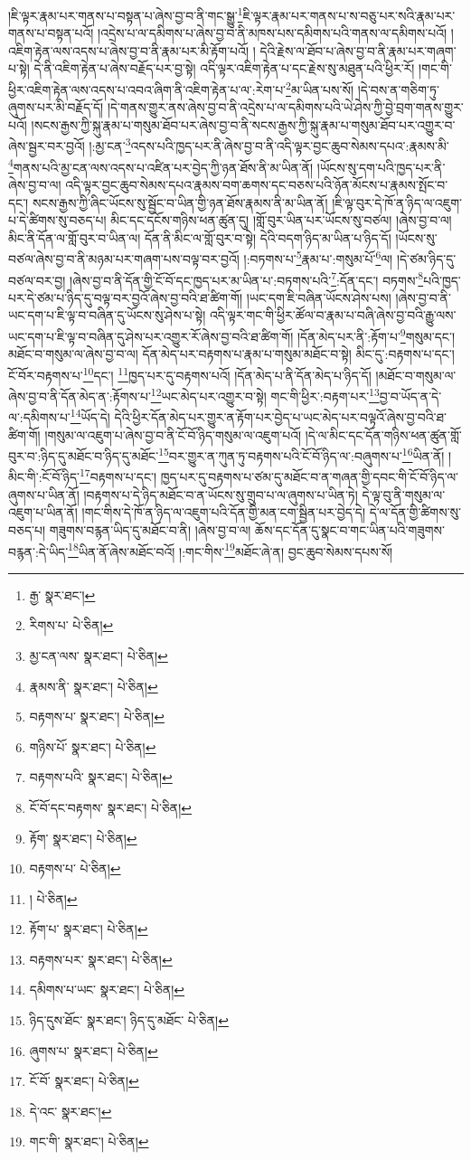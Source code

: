 །ཇི་ལྟར་རྣམ་པར་གནས་པ་བསྟན་པ་ཞེས་བྱ་བ་ནི་གང་སྒྱུ་\footnote{རྒྱ་  སྣར་ཐང་། }ཇི་ལྟར་རྣམ་པར་གནས་པ་ས་བཅུ་པར་སའི་རྣམ་པར་གནས་པ་བསྟན་པའོ། །འདྲེས་པ་ལ་དམིགས་པ་ཞེས་བྱ་བ་ནི་མཁས་པས་དམིགས་པའི་གནས་ལ་དམིགས་པའོ། །འཇིག་རྟེན་ལས་འདས་པ་ཞེས་བྱ་བ་ནི་རྣམ་པར་མི་རྟོག་པའོ། །
དེའི་རྗེས་ལ་ཐོབ་པ་ཞེས་བྱ་བ་ནི་རྣམ་པར་གཞག་པ་སྟེ། དེ་ནི་འཇིག་རྟེན་པ་ཞེས་བརྗོད་པར་བྱ་སྟེ། འདི་ལྟར་འཇིག་རྟེན་པ་དང་རྗེས་སུ་མཐུན་པའི་ཕྱིར་རོ། །གང་གི་ཕྱིར་འཇིག་རྟེན་ལས་འདས་པ་འབའ་ཞིག་ནི་འཇིག་རྟེན་པ་ལ་:རེག་པ་\footnote{རིགས་པ་  པེ་ཅིན། }མ་ཡིན་པས་སོ། །དེ་བས་ན་གཅིག་ཏུ་ཞུགས་པར་མི་བརྗོད་དོ། །དེ་གནས་གྱུར་ནས་ཞེས་བྱ་བ་ནི་འདྲེས་པ་ལ་དམིགས་པའི་ཡེ་ཤེས་ཀྱི་བྱེ་བྲག་གནས་གྱུར་པའོ། །སངས་རྒྱས་ཀྱི་སྐུ་རྣམ་པ་གསུམ་ཐོབ་པར་ཞེས་བྱ་བ་ནི་སངས་རྒྱས་ཀྱི་སྐུ་རྣམ་པ་གསུམ་ཐོབ་པར་འགྱུར་བ་ཞེས་སྦྱར་བར་བྱའོ། །:མྱ་ངན་\footnote{མྱ་ངན་ལས་  སྣར་ཐང་།  པེ་ཅིན། }འདས་པའི་ཁྱད་པར་ནི་ཞེས་བྱ་བ་ནི་འདི་ལྟར་བྱང་ཆུབ་སེམས་དཔའ་:རྣམས་མི་\footnote{རྣམས་ནི་  སྣར་ཐང་།  པེ་ཅིན། }གནས་པའི་མྱ་ངན་ལས་འདས་པ་འཛིན་པར་བྱེད་ཀྱི་ཉན་ཐོས་ནི་མ་ཡིན་ནོ། །ཡོངས་སུ་དག་པའི་ཁྱད་པར་ནི་ཞེས་བྱ་བ་ལ། འདི་ལྟར་བྱང་ཆུབ་སེམས་དཔའ་རྣམས་བག་ཆགས་དང་བཅས་པའི་ཉོན་མོངས་པ་རྣམས་སྤོང་བ་དང་། སངས་རྒྱས་ཀྱི་ཞིང་ཡོངས་སུ་སྦྱོང་བ་ཡིན་གྱི་ཉན་ཐོས་རྣམས་ནི་མ་ཡིན་ནོ། །ཇི་ལྟ་བུར་དེ་ཁོ་ན་ཉིད་ལ་འཇུག་པ་དེ་ཚིགས་སུ་བཅད་པ། མིང་དང་དངོས་གཉིས་ཕན་ཚུན་དུ། །གློ་བུར་ཡིན་པར་ཡོངས་སུ་བཙལ། །ཞེས་བྱ་བ་ལ། མིང་ནི་དོན་ལ་གློ་བུར་བ་ཡིན་ལ། དོན་ནི་མིང་ལ་གློ་བུར་བ་སྟེ། དེའི་བདག་ཉིད་མ་ཡིན་པ་ཉིད་དོ། །ཡོངས་སུ་བཙལ་ཞེས་བྱ་བ་ནི་མཉམ་པར་གཞག་པས་བལྟ་བར་བྱའོ། །:བཏགས་པ་\footnote{བརྟགས་པ་  སྣར་ཐང་།  པེ་ཅིན། }རྣམ་པ་:གསུམ་པོ་\footnote{གཉིས་པོ་  སྣར་ཐང་།  པེ་ཅིན། }ལ། །དེ་ཙམ་ཉིད་དུ་བཙལ་བར་བྱ། །ཞེས་བྱ་བ་ནི་དོན་གྱི་ངོ་བོ་དང་ཁྱད་པར་མ་ཡིན་པ་:བཏགས་པའི་\footnote{བརྟགས་པའི་  སྣར་ཐང་།  པེ་ཅིན། }:དོན་དང་། བཏགས་\footnote{ངོ་བོ་དང་བརྟགས་  སྣར་ཐང་།  པེ་ཅིན། }པའི་ཁྱད་པར་དེ་ཙམ་པ་ཉིད་དུ་བལྟ་བར་བྱའོ་ཞེས་བྱ་བའི་ཐ་ཚིག་གོ། །ཡང་དག་ཇི་བཞིན་ཡོངས་ཤེས་པས། །ཞེས་བྱ་བ་ནི་ཡང་དག་པ་ཇི་ལྟ་བ་བཞིན་དུ་ཡོངས་སུ་ཤེས་པ་སྟེ། འདི་ལྟར་གང་གི་ཕྱིར་ཚོལ་བ་རྣམ་པ་བཞི་ཞེས་བྱ་བའི་རྒྱུ་ལས་ཡང་དག་པ་ཇི་ལྟ་བ་བཞིན་དུ་ཤེས་པར་འགྱུར་རོ་ཞེས་བྱ་བའི་ཐ་ཚིག་གོ། །དོན་མེད་པར་ནི་:རྟོག་པ་\footnote{རྟོག་  སྣར་ཐང་།  པེ་ཅིན། }གསུམ་དང་། མཐོང་བ་གསུམ་ལ་ཞེས་བྱ་བ་ལ། དོན་མེད་པར་བརྟགས་པ་རྣམ་པ་གསུམ་མཐོང་བ་སྟེ། མིང་དུ་:བརྟགས་པ་དང་། ངོ་བོར་བརྟགས་པ་\footnote{བརྟགས་པ་  པེ་ཅིན། }དང་། \footnote{།    པེ་ཅིན། }ཁྱད་པར་དུ་བརྟགས་པའོ། །དོན་མེད་པ་ནི་དོན་མེད་པ་ཉིད་དོ། །མཐོང་བ་གསུམ་ལ་ཞེས་བྱ་བ་ནི་དོན་མེད་ན་:རྟོགས་པ་\footnote{རྟོག་པ་  སྣར་ཐང་།  པེ་ཅིན། }ཡང་མེད་པར་འགྱུར་བ་སྟེ། གང་གི་ཕྱིར་:བརྟག་པར་\footnote{བརྟགས་པར་  སྣར་ཐང་།  པེ་ཅིན། }བྱ་བ་ཡོད་ན་དེ་ལ་:དམིགས་པ་\footnote{དམིགས་པ་ཡང་  སྣར་ཐང་།  པེ་ཅིན། }ཡོད་དེ། དེའི་ཕྱིར་དོན་མེད་པར་གྱུར་ན་རྟོག་པར་བྱེད་པ་ཡང་མེད་པར་བལྟའོ་ཞེས་བྱ་བའི་ཐ་ཚིག་གོ། །གསུམ་ལ་འཇུག་པ་ཞེས་བྱ་བ་ནི་ངོ་བོ་ཉིད་གསུམ་ལ་འཇུག་པའོ། །དེ་ལ་མིང་དང་དོན་གཉིས་ཕན་ཚུན་གློ་བུར་བ་:ཉིད་དུ་མཐོང་བ་ཉིད་དུ་མཐོང་\footnote{ཉིད་དུས་ཐོང་  སྣར་ཐང་། ཉིད་དུ་མཐོང་  པེ་ཅིན། }བར་གྱུར་ན་ཀུན་ཏུ་བརྟགས་པའི་ངོ་བོ་ཉིད་ལ་:བཞུགས་པ་\footnote{ཞུགས་པ་  སྣར་ཐང་།  པེ་ཅིན། }ཡིན་ནོ། །མིང་གི་:ངོ་བོ་ཉིད་\footnote{ངོ་བོ་  སྣར་ཐང་།  པེ་ཅིན། }བརྟགས་པ་དང་། ཁྱད་པར་དུ་བརྟགས་པ་ཙམ་དུ་མཐོང་བ་ན་གཞན་གྱི་དབང་གི་ངོ་བོ་ཉིད་ལ་ཞུགས་པ་ཡིན་ནོ། །བརྟགས་པ་དེ་ཉིད་མཐོང་བ་ན་ཡོངས་སུ་གྲུབ་པ་ལ་ཞུགས་པ་ཡིན་ཏེ། དེ་ལྟ་བུ་ནི་གསུམ་ལ་འཇུག་པ་ཡིན་ནོ། །གང་གིས་དེ་ཁོ་ན་ཉིད་ལ་འཇུག་པའི་དོན་གྱི་མན་ངག་སྦྱིན་པར་བྱེད་དེ། དེ་ལ་དོན་གྱི་ཚིགས་སུ་བཅད་པ། གཟུགས་བརྙན་ཡིད་དུ་མཐོང་བ་ནི། །ཞེས་བྱ་བ་ལ། ཆོས་དང་དོན་དུ་སྣང་བ་གང་ཡིན་པའི་གཟུགས་བརྙན་:དེ་ཡིད་\footnote{དེ་འང་  སྣར་ཐང་། }ཡིན་ནོ་ཞེས་མཐོང་བའོ། །:གང་གིས་\footnote{གང་གི་  སྣར་ཐང་།  པེ་ཅིན། }མཐོང་ཞེ་ན། བྱང་ཆུབ་སེམས་དཔས་སོ། 